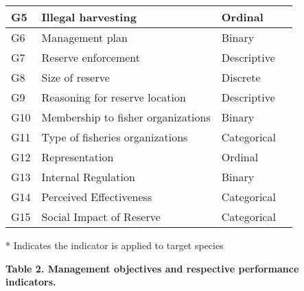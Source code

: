 \documentclass[12pt,]{article}
\begin{document}
\begin{table}[H]
{\begin{tabular}{l|l|l|l}
\hline
\hspace{1em}G5 & Illegal harvesting & Ordinal & \\
\hline
\hspace{1em}G6 & Management plan & Binary & \\
\hline
\hspace{1em}G7 & Reserve enforcement & Descriptive & \\
\hline
\hspace{1em}G8 & Size of reserve & Discrete & \\
\hline
\hspace{1em}G9 & Reasoning for reserve location & Descriptive & \\
\hline
\hspace{1em}G10 & Membership to fisher organizations & Binary & \\
\hline
\hspace{1em}G11 & Type of fisheries organizations & Categorical & \\
\hline
\hspace{1em}G12 & Representation & Ordinal & \\
\hline
\hspace{1em}G13 & Internal Regulation & Binary & \\
\hline
\hspace{1em}G14 & Perceived Effectiveness & Categorical & \\
\hline
\hspace{1em}G15 & Social Impact of Reserve & Categorical & \\
\hline
\end{tabular}}
\end{table}

* Indicates the indicator is applied to target species

\clearpage

\textbf{Table 2. Management objectives and respective performance
indicators.}
\end{document}
